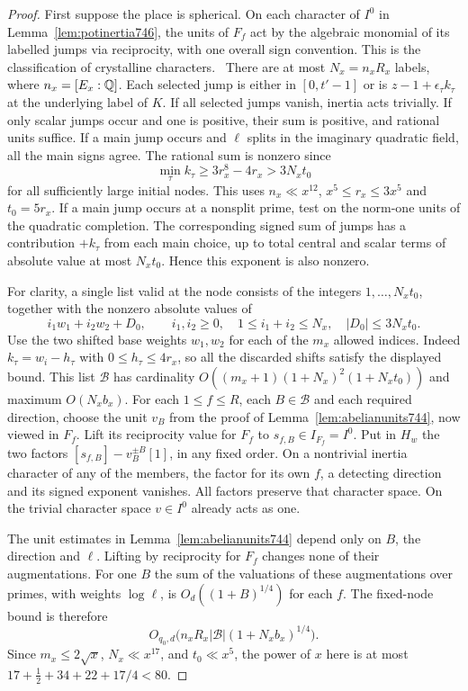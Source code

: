 \documentclass[a4paper,11pt]{article}
\theoremstyle{definition}
\theoremstyle{remark}
\numberwithin{equation}{section}
\begin{document}
\begin{proof}
First suppose the place is spherical. On each character of \(I^0\)
in Lemma~\ref{lem:potinertia746}, the units of \(F_f\) act by
the algebraic monomial of its labelled jumps via reciprocity,
with one overall sign convention. This is the classification of
crystalline characters.~\cite[Appendix~B, Proposition~B.4]{X-VII-conradunits744}
There are at most \(N_x=n_x R_x\) labels, where \(n_x=[E_x:\mathbb Q]\).
Each selected jump is either in \([0,t'-1]\) or is
\(z-1+\epsilon_\tau k_\tau\) at the underlying label of \(K\).
If all selected jumps vanish, inertia acts trivially. If only
scalar jumps occur and one is positive, their sum is positive,
and rational units suffice. If a main jump occurs and \(\ell\)
splits in the imaginary quadratic field, all the main signs
agree. The rational sum is nonzero since
\[
 \min_\tau k_\tau\ge3r_x^8-4r_x>3N_xt_0
\]
for all sufficiently large initial nodes. This uses
\(n_x\ll x^{12}\), \(x^5\le r_x\le3x^5\) and \(t_0=5r_x\).
If a main jump occurs at a nonsplit prime, test on the norm-one
units of the quadratic completion. The corresponding signed sum
of jumps has a contribution \(+k_\tau\) from each main choice,
up to total central and scalar terms of absolute value at most
\(N_xt_0\). Hence this exponent is also nonzero.

For clarity, a single list valid at the node consists of the
integers \(1,\ldots,N_xt_0\), together with the nonzero absolute
values of
\[
    i_1w_1+i_2w_2+D_0,\qquad i_1,i_2\ge0,\quad
    1\le i_1+i_2\le N_x,\quad |D_0|\le3N_xt_0 .
\]
Use the two shifted base weights \(w_1,w_2\) for each of the
\(m_x\) allowed indices. Indeed \(k_\tau=w_i-h_\tau\) with
\(0\le h_\tau\le4r_x\), so all the discarded shifts satisfy
the displayed bound. This list \(\mathcal B\) has cardinality
\(O((m_x+1)(1+N_x)^2(1+N_xt_0))\) and maximum \(O(N_x b_x)\).
For each \(1\le f\le R\), each \(B\in\mathcal B\) and each
required direction, choose the unit \(v_B\) from the proof of
Lemma~\ref{lem:abelianunits744}, now viewed in \(F_f\).
Lift its reciprocity value for \(F_f\) to \(s_{f,B}\in I_{F_f}=I^0\).
Put in \(H_w\) the two factors \([s_{f,B}]-v_B^{\pm B}[1]\),
in any fixed order. On a nontrivial inertia character of any
of the members, the factor for its own \(f\), a detecting direction
and its signed exponent vanishes. All factors preserve that
character space. On the trivial character space \(v\in I^0\)
already acts as one.

The unit estimates in Lemma~\ref{lem:abelianunits744} depend
only on \(B\), the direction and \(\ell\). Lifting by reciprocity
for \(F_f\) changes none of their augmentations. For one \(B\)
the sum of the valuations of these augmentations over primes,
with weights \(\log\ell\), is \(O_d((1+B)^{1/4})\) for each \(f\).
The fixed-node bound is therefore
\[
    O_{q_0,d}\big(n_x R_x|\mathcal B|(1+N_x b_x)^{1/4}\big).
\]
Since \(m_x\le2\sqrt x\), \(N_x\ll x^{17}\), and \(t_0\ll x^5\),
the power of \(x\) here is at most
\(17+\tfrac12+34+22+17/4<80\).


\end{proof}
\end{document}
